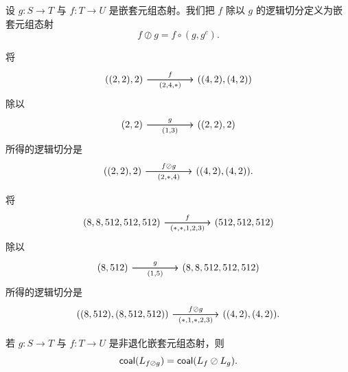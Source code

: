 
\begin{definition}\label{definitionoflogicaldivisionofnestedtuplemorphisms}
    设 $g:S \to T$ 与 $f:T \to U$ 是嵌套元组态射。我们把 $f$ 除以 $g$ 的逻辑切分定义为嵌套元组态射
    \[
    f \oslash g = f \circ (g,g^c).
    \]
\end{definition}

\begin{example}
    将
    \[\begin{tikzcd} ((2,2),2) \ar[rr,"f"] \ar[rr,swap,"(2{,}4{,}*)
"] & &  ((4,2),(4,2)) \end{tikzcd} \]
    除以
    \[ \begin{tikzcd} (2,2) \ar[rr,"g"] \ar[rr,swap,"(1{,}3)"] & &  ((2,2),2) \end{tikzcd} \]
    所得的逻辑切分是
    \[ \begin{tikzcd} ((2,2),2) \ar[rr,"f \oslash g"] \ar[rr,swap,"(2{,}*{,}4)"] & &  ((4,2),(4,2)). \end{tikzcd} \]
\end{example}

\begin{example}
    将
    \[\begin{tikzcd} (8,8,512,512,512) \ar[rr,"f"] \ar[rr,swap,"(*{,}*{,}1{,}2{,}3)"] & &  (512,512,512) \end{tikzcd} \]
    除以
    \[ \begin{tikzcd} (8,512) \ar[rr,"g"] \ar[rr,swap,"(1{,}5)"] & &  (8,8,512,512,512) \end{tikzcd} \]
    所得的逻辑切分是
    \[ \begin{tikzcd} ((8,512),(8,512,512)) \ar[rr,"f \oslash g"] \ar[rr,swap,"(*{,}1{,}*{,}2{,}3)"] & &  ((4,2),(4,2)). \end{tikzcd} \]
\end{example}



\begin{proposition}\label{coalesceoflogicaldivision}
    若 $g:S \to T$ 与 $f:T \to U$ 是非退化嵌套元组态射，则
    \[
    \mathsf{coal}(L_{f \oslash g}) = \mathsf{coal}(L_f \oslash L_g).
    \]
\end{proposition}


